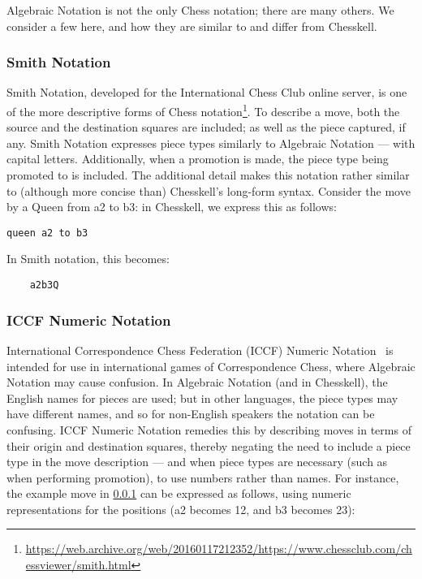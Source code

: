 Algebraic Notation is not the only Chess notation; there are many others. We consider a few here, and how they are similar to and differ from Chesskell.

\subsubsection{Smith Notation} \label{smithsection}

Smith Notation, developed for the International Chess Club online server, is one of the more descriptive forms of Chess notation\footnote{\url{https://web.archive.org/web/20160117212352/https://www.chessclub.com/chessviewer/smith.html}}. To describe a move, both the source and the destination squares are included; as well as the piece captured, if any. Smith Notation expresses piece types similarly to Algebraic Notation --- with capital letters. Additionally, when a promotion is made, the piece type being promoted to is included. The additional detail makes this notation rather similar to (although more concise than) Chesskell's long-form syntax. Consider the move by a Queen from a2 to b3: in Chesskell, we express this as follows:

\begin{lstlisting}
queen a2 to b3
\end{lstlisting}

In Smith notation, this becomes:

\begin{verbatim}
    a2b3Q
\end{verbatim}

\subsubsection{ICCF Numeric Notation} \label{numberextension}

International Correspondence Chess Federation (ICCF) Numeric Notation~\cite{iccfnotation} is intended for use in international games of Correspondence Chess, where Algebraic Notation may cause confusion. In Algebraic Notation (and in Chesskell), the English names for pieces are used; but in other languages, the piece types may have different names, and so for non-English speakers the notation can be confusing. ICCF Numeric Notation remedies this by describing moves in terms of their origin and destination squares, thereby negating the need to include a piece type in the move description --- and when piece types are necessary (such as when performing promotion), to use numbers rather than names. For instance, the example move in \cref{smithsection} can be expressed as follows, using numeric representations for the positions (a2 becomes 12, and b3 becomes 23):

